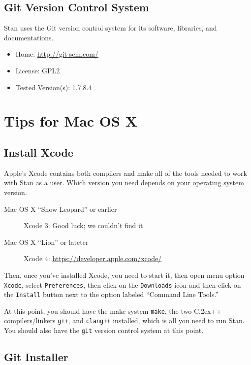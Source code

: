 \documentclass[10pt]{report}
\newcommand{\Stan}{Stan\xspace}
\newcommand*{\Cpp}{C\raise.2ex\hbox{\footnotesize ++}\xspace} %
\newcommand{\code}[1]{{\tt #1}}
\begin{document}
\subsection{Git Version Control System}

\Stan uses the Git version control system for its software, libraries,
and documentations.  
% 
\begin{itemize}
\item Home: \url{http://git-scm.com/}
\item License: GPL2
\item Tested Version(s): 1.7.8.4
\end{itemize}



\section{Tips for Mac OS X}

\subsection{Install Xcode}

Apple's Xcode contains both compilers and make all of the tools needed 
to work with \Stan as a user.  Which version you need depends on your
operating system version.

\begin{description}
\item[Mac OS X ``Snow Leopard'' or earlier]
Xcode 3: Good luck; we couldn't find it
\item[Mac OS X ``Lion'' or lateter]
Xcode 4: \url{https://developer.apple.com/xcode/}
\end{description}

Then, once you've installed Xcode, you need to start it, then open
menu option \code{Xcode}, select \code{Preferences}, then click on the
\code{Downloads} icon and then click on the \code{Install} button next
to the option labeled ``Command Line Tools.''

At this point, you should have the make system \code{make}, the two
\Cpp compilers/linkers \code{g++}, and \code{clang++} installed, which
is all you need to run \Stan.  You should also have the \code{git}
version control system at this point.


\subsection{Git Installer}
\end{document}
